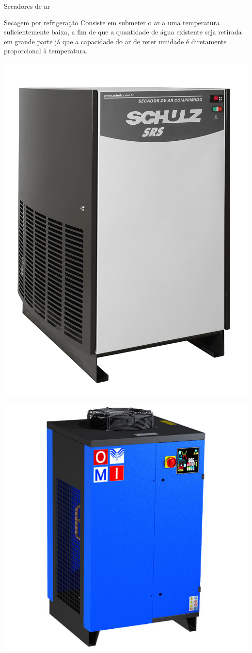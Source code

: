 \begin{frame}{Secadores de ar}
	\begin{block}{Secagem por refrigeração}
		Consiste em submeter o ar a uma temperatura
		suficientemente baixa, a fim de que a quantidade de água existente seja retirada em grande parte já que a capacidade do ar de reter umidade é diretamente proporcional à temperatura.
	\end{block}

	\begin{minipage}{0.45\linewidth}
		\centering
		\includegraphics[width=0.7\linewidth]{Figuras/Ch13/fig4}
	\end{minipage}
	\hfill
	\begin{minipage}{0.45\linewidth}
		\centering
		\includegraphics[width=0.9\linewidth]{Figuras/Ch13/fig5}
	\end{minipage}
\end{frame}


